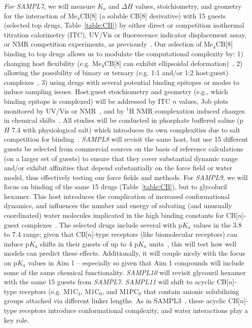 \documentclass[11pt]{article}
\begin{document}
\emph{For SAMPL7}, we will measure $K_a$ and $\Delta H$ values, stoichiometry, and geometry for the interaction of Me$_4$CB[8] (a soluble CB[8] derivative) with 15 guests (selected top drugs, Table~\ref{table:CB}) by either direct or competition isothermal titration calorimetry (ITC), UV/Vis or fluorescence indicator displacement assay, or NMR competition experiments, as previously~\cite{cao_attomolar_2014, liu_cucurbituril_2005, ma_acyclic_2010, she_glycoluril-derived_2016}.  
Our selection of Me$_4$CB[8] binding to top drugs allows us to modulate the computational complexity by: 1) changing host flexibility (e.g. Me$_4$CB[8] can exhibit ellipsoidal deformation)~\cite{vinciguerra_synthesis_2015}, 2) allowing the possibility of binary or ternary (e.g. 1:1 and/or 1:2 host:guest) complexes~\cite{ko_supramolecular_2007, barrow_cucurbituril-based_2015, urbach_molecular_2011}, 3) using drugs with several potential binding epitopes or modes to induce sampling issues.  
Host:guest stoichiometry and geometry (e.g., which binding epitope is complexed) will be addressed by ITC $n$ values, Job plots monitored by UV/Vis or NMR~\cite{connors_binding_1987}, and by $^1$H NMR complexation induced changes in chemical shifts~\cite{masson_cucurbituril_2012}.  
All studies will be conducted in phosphate buffered saline (p$H$ 7.4 with physiological salt) which introduces its own complexities due to salt competition for binding~\cite{marquez_mechanism_2004, Mobley:2017:AnnualReviewofBiophysics}. 
\emph{SAMPL8} will revisit the same host, but use 15 different guests be selected from commercial sources on the basis of reference calculations (on a larger set of guests) to ensure that they cover substantial dynamic range and/or exhibit affinities that depend substantially on the force field or water model, thus effectively testing our force fields and methods.
For \emph{SAMPL9}, we will focus on binding of the same 15 drugs (Table~\ref{table:CB}), but to glycoluril hexamer. 
This host introduces the complication of increased conformational dynamics, and influences the number and energy of solvating (and unusually coordinated) water molecules implicated in the high binding constants for CB[$n$]-guest complexes~\cite{biedermann_release_2012, biedermann_hydrophobic_2014}.  
The selected drugs include several with p$K_a$ values in the 3.8 to 7.4 range; given that CB[$n$]-type receptors (like biomolecular receptors) can induce p$K_a$ shifts in their guests of up to 4 p$K_a$ units~\cite{saleh_activation_2008, nau_deep_2011, ghosh_strategic_2012}, this will test how well models can predict these effects. 
Additionally, it will couple nicely with the focus on p$K_a$ values in Aim 1 -- especially so given that Aim 1 compounds will include some of the same chemical functionality.
\emph{SAMPL10} will revisit glycouril hexamer with the same 15 guests from \emph{SAMPL7}.
\emph{SAMPL11} will shift to acyclic CB[$n$]-type receptors (e.g. M1C$_3$, M1C$_0$, and M1PC$_0$ that contain anionic solubilizing groups attached via different linker lengths.  
As in SAMPL3~\cite{muddana_sampl3_2012}, these acyclic CB[$n$]-type receptors introduce conformational complexity, and water interactions play a key role.
\end{document}
